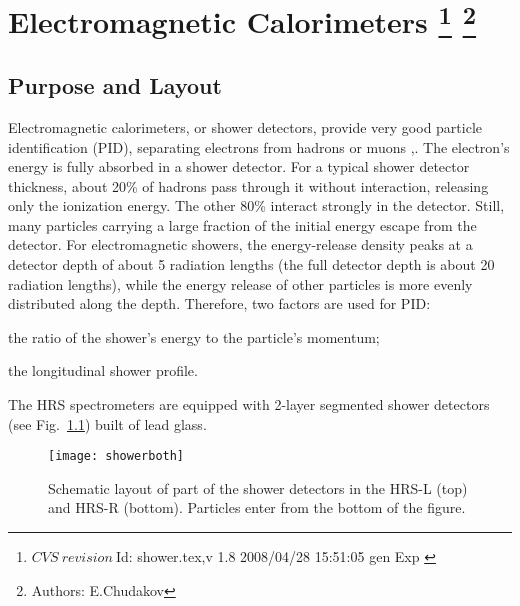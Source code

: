 \chapter[Electromagnetic Calorimeters]{Electromagnetic Calorimeters
\footnote{
  $CVS~revision~ $Id: shower.tex,v 1.8 2008/04/28 15:51:05 gen Exp $ $
}
\footnote{Authors: E.Chudakov }
}

\section{Purpose and Layout}

Electromagnetic calorimeters, or shower detectors, provide very good
particle identification (PID), separating electrons from hadrons or
muons \cite{Bartoszek:1991ex},\cite{Appel:1975tt}.  The electron's energy
is fully absorbed in a shower detector.  For a typical shower detector
thickness, about 20\% of hadrons pass through it without interaction,
releasing only the ionization energy.  The other 80\% interact
strongly in the detector. Still, many particles carrying a large
fraction of the initial energy escape from the detector. For
electromagnetic showers, the energy-release density peaks at a
detector depth of about 5 radiation lengths (the full detector depth
is about 20 radiation lengths), while the energy release of other
particles is more evenly distributed along the depth.  Therefore, two
factors are used for PID:
\begin{list}{.~}{\setlength{\itemsep}{-0.15cm}}
  \item the ratio of the shower's energy to the particle's momentum;
  \item the longitudinal shower profile.
\end{list}

The HRS spectrometers are equipped with 2-layer segmented shower
detectors (see Fig.~\ref{fig:hrs-det-shower_layout}) built of
lead glass.
\begin{figure}[htb]
\begin{center}
   \texttt{[image: showerboth]}
\end{center}
\caption[Schematic layout of part of the shower detectors in the HRS]%
{Schematic layout of part of the shower detectors in the HRS-L
(top) and HRS-R (bottom). Particles enter from the bottom of the figure.}
\label{fig:hrs-det-shower_layout}
\end{figure}
  
